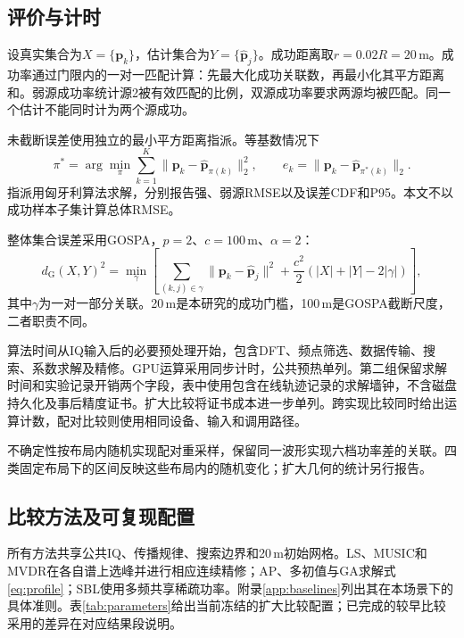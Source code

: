 \subsection{评价与计时}
设真实集合为$X=\{\bm p_k\}$，估计集合为$Y=\{\widehat{\bm p}_j\}$。成功距离取$r=0.02R=20$\,m。成功率通过门限内的一对一匹配计算：先最大化成功关联数，再最小化其平方距离和。弱源成功率统计源2被有效匹配的比例，双源成功率要求两源均被匹配。同一个估计不能同时计为两个源成功。

未截断误差使用独立的最小平方距离指派。等基数情况下
\begin{equation}
 \pi^*=\arg\min_{\pi}\sum_{k=1}^{K}
 \|\bm p_k-\widehat{\bm p}_{\pi(k)}\|_2^2,\qquad
 e_k=\|\bm p_k-\widehat{\bm p}_{\pi^*(k)}\|_2 .\label{eq:assignment}
\end{equation}
指派用匈牙利算法求解\cite{Kuhn1955}，分别报告强、弱源RMSE以及误差CDF和P95。本文不以成功样本子集计算总体RMSE。

整体集合误差采用GOSPA\cite{Rahmathullah2017}，$p=2$、$c=100$\,m、$\alpha=2$：
\begin{equation}
 d_{\mathrm G}(X,Y)^2=
 \min_{\gamma}\left[\sum_{(k,j)\in\gamma}\|\bm p_k-\widehat{\bm p}_j\|^2
 +\frac{c^2}{2}\left(|X|+|Y|-2|\gamma|\right)\right],\label{eq:gospa}
\end{equation}
其中$\gamma$为一对一部分关联。20\,m是本研究的成功门槛，100\,m是GOSPA截断尺度，二者职责不同。

算法时间从IQ输入后的必要预处理开始，包含DFT、频点筛选、数据传输、搜索、系数求解及精修。GPU运算采用同步计时，公共预热单列。第二组保留求解时间和实验记录开销两个字段，表中使用包含在线轨迹记录的求解墙钟，不含磁盘持久化及事后精度证书。扩大比较将证书成本进一步单列。跨实现比较同时给出运算计数，配对比较则使用相同设备、输入和调用路径。

不确定性按布局内随机实现配对重采样，保留同一波形实现六档功率差的关联。四类固定布局下的区间反映这些布局内的随机变化；扩大几何的统计另行报告。

\subsection{比较方法及可复现配置}\label{sec:baselines}
所有方法共享公共IQ、传播规律、搜索边界和20\,m初始网格。LS、MUSIC和MVDR在各自谱上选峰并进行相应连续精修；AP、多初值与GA求解式\eqref{eq:profile}；SBL使用多频共享稀疏功率。附录\ref{app:baselines}列出其在本场景下的具体准则。表\ref{tab:parameters}给出当前冻结的扩大比较配置；已完成的较早比较采用的差异在对应结果段说明。
\par\par
\par

